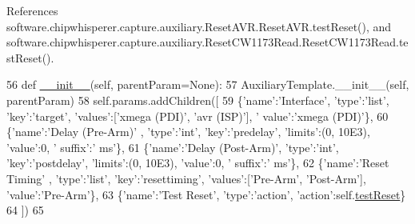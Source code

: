 References software.\+chipwhisperer.\+capture.\+auxiliary.\+Reset\+A\+V\+R.\+Reset\+A\+V\+R.\+test\+Reset(), and software.\+chipwhisperer.\+capture.\+auxiliary.\+Reset\+C\+W1173\+Read.\+Reset\+C\+W1173\+Read.\+test\+Reset().


\begin{DoxyCode}
56     \textcolor{keyword}{def }\hyperlink{classsoftware_1_1chipwhisperer_1_1capture_1_1auxiliary_1_1ResetCW1173Read_1_1ResetCW1173Read_abb0ea1a542c8b474fe9324ea19085a0a}{\_\_init\_\_}(self, parentParam=None):
57         AuxiliaryTemplate.\_\_init\_\_(self, parentParam)
58         self.params.addChildren([
59             \{\textcolor{stringliteral}{'name'}:\textcolor{stringliteral}{'Interface'}, \textcolor{stringliteral}{'type'}:\textcolor{stringliteral}{'list'}, \textcolor{stringliteral}{'key'}:\textcolor{stringliteral}{'target'}, \textcolor{stringliteral}{'values'}:[\textcolor{stringliteral}{'xmega (PDI)'}, \textcolor{stringliteral}{'avr (ISP)'}], \textcolor{stringliteral}{'
      value'}:\textcolor{stringliteral}{'xmega (PDI)'}\},
60             \{\textcolor{stringliteral}{'name'}:\textcolor{stringliteral}{'Delay (Pre-Arm)'} , \textcolor{stringliteral}{'type'}:\textcolor{stringliteral}{'int'},  \textcolor{stringliteral}{'key'}:\textcolor{stringliteral}{'predelay'},  \textcolor{stringliteral}{'limits'}:(0, 10E3), \textcolor{stringliteral}{'value'}:0, \textcolor{stringliteral}{'
      suffix'}:\textcolor{stringliteral}{' ms'}\},
61             \{\textcolor{stringliteral}{'name'}:\textcolor{stringliteral}{'Delay (Post-Arm)'}, \textcolor{stringliteral}{'type'}:\textcolor{stringliteral}{'int'},  \textcolor{stringliteral}{'key'}:\textcolor{stringliteral}{'postdelay'}, \textcolor{stringliteral}{'limits'}:(0, 10E3), \textcolor{stringliteral}{'value'}:0, \textcolor{stringliteral}{'
      suffix'}:\textcolor{stringliteral}{' ms'}\},
62             \{\textcolor{stringliteral}{'name'}:\textcolor{stringliteral}{'Reset Timing'}  , \textcolor{stringliteral}{'type'}:\textcolor{stringliteral}{'list'}, \textcolor{stringliteral}{'key'}:\textcolor{stringliteral}{'resettiming'}, \textcolor{stringliteral}{'values'}:[\textcolor{stringliteral}{'Pre-Arm'}, \textcolor{stringliteral}{'Post-Arm'}],
       \textcolor{stringliteral}{'value'}:\textcolor{stringliteral}{'Pre-Arm'}\},
63             \{\textcolor{stringliteral}{'name'}:\textcolor{stringliteral}{'Test Reset'}, \textcolor{stringliteral}{'type'}:\textcolor{stringliteral}{'action'}, \textcolor{stringliteral}{'action'}:self.\hyperlink{classsoftware_1_1chipwhisperer_1_1capture_1_1auxiliary_1_1ResetCW1173Read_1_1ResetCW1173Read_a86326b8f28747c5df4025c50be219a14}{testReset}\}
64         ])
65 
\end{DoxyCode}


